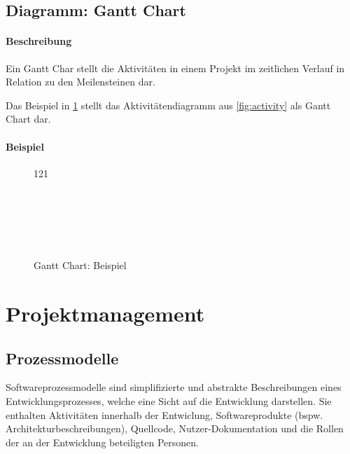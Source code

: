 		\subsection{Diagramm: Gantt Chart}
			\label{diagram:gantt}

			\paragraph{Beschreibung}
				Ein Gantt Char stellt die Aktivitäten in einem Projekt im zeitlichen Verlauf in Relation zu den Meilensteinen dar.

				Das Beispiel in \ref{fig:gantt} stellt das Aktivitätendiagramm aus \ref{fig:activity} als Gantt Chart dar.

			\paragraph{Beispiel}
				\begin{figure}[ht]
					\centering
					\begin{ganttchart}[
							title/.append style={fill=\thepagecolor},
							bar/.append style={fill=\thepagecolor},
							canvas/.append style={fill=\thepagecolor},
							vgrid,
						]{1}{21}
						\\
						 \\
						 \\
						 \\
						 \\
						 \\
					\end{ganttchart}
					\caption{Gantt Chart: Beispiel}
					\label{fig:gantt}
				\end{figure}

	\section{Projektmanagement}
		\subsection{Prozessmodelle}
			Softwareprozessmodelle sind simplifizierte und abstrakte Beschreibungen eines Entwicklungsprozesses, welche eine Sicht auf die Entwicklung darstellen. Sie enthalten Aktivitäten innerhalb der Entwiclung, Softwareprodukte (bspw. Architekturbeschreibungen), Quellcode, Nutzer-Dokumentation und die Rollen der an der Entwicklung beteiligten Personen.

